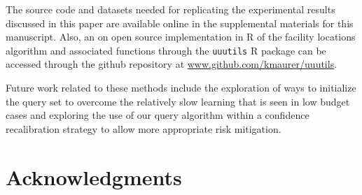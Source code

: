 \documentclass[10pt, conference]{IEEEtran}
\newcommand{\km}[1]{{\color{red} #1}} %
\begin{document}
The source code and datasets needed for replicating the experimental results discussed in this paper are available online in the supplemental materials for this manuscript. Also, an on open source  implementation in R \cite{R} of the facility locations algorithm and associated functions through the \km{\texttt{uuutils}} R package can be accessed through the github repository at \km{\url{www.github.com/kmaurer/uuutils}}.



Future work related to these methods include the exploration of ways to initialize the query set to overcome the relatively slow learning that is seen in low budget cases and exploring the use of our query algorithm within a confidence recalibration strategy to allow more appropriate risk mitigation. 

\section{Acknowledgments} 
\end{document}
